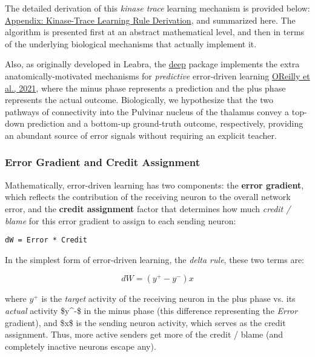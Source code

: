\documentclass[11pt,twoside]{article}
\newif\myifpdf
\begin{document}
The detailed derivation of this \emph{kinase trace} learning mechanism is provided below: \protect\hyperlink{appendix-kinase-trace-learning-rule-derivation}{Appendix: Kinase-Trace Learning Rule Derivation}, and summarized here. The algorithm is presented first at an abstract mathematical level, and then in terms of the underlying biological mechanisms that actually implement it.

Also, as originally developed in Leabra, the \href{https://github.com/emer/axon/blob/master/deep}{deep} package implements the extra anatomically-motivated mechanisms for \emph{predictive} error-driven learning \href{https://ccnlab.org/papers/OReillyRussinZolfagharEtAl21.pdf}{OReilly et al., 2021}, where the minus phase represents a prediction and the plus phase represents the actual outcome. Biologically, we hypothesize that the two pathways of connectivity into the Pulvinar nucleus of the thalamus convey a top-down prediction and a bottom-up ground-truth outcome, respectively, providing an abundant source of error signals without requiring an explicit teacher. 


\subsubsection{Error Gradient and Credit Assignment}

Mathematically, error-driven learning has two components: the \textbf{error gradient}, which reflects the contribution of the receiving neuron to the overall network error, and the \textbf{credit assignment} factor that determines how much \emph{credit / blame} for this error gradient to assign to each sending neuron: 

\begin{verbatim}
dW = Error * Credit
\end{verbatim}

In the simplest form of error-driven learning, the \emph{delta rule},
these two terms are:

\begin{equation}
dW = (y^+ - y^-) x 
\end{equation}

where $y^+$ is the \emph{target} activity of the receiving neuron in the plus phase vs. its \emph{actual} activity \$y\^{}-\$ in the minus phase (this difference representing the \emph{Error} gradient), and \$x\$ is the sending neuron activity, which serves as the credit assignment. Thus, more active senders get more of the credit / blame (and completely inactive neurons escape any).
\end{document}
